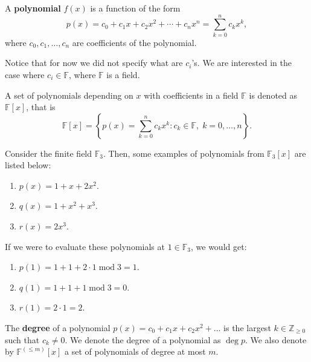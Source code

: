 \documentclass[../lecture-notes.tex]{subfiles}
\begin{document}
\begin{definition}
    A \textbf{polynomial} $f(x)$ is a function of the form
    \begin{equation}
        p(x) = c_0 + c_1 x + c_2 x^2 + \cdots + c_n x^n = \sum_{k=0}^{n} c_k x^k,
    \end{equation}
    where $c_0, c_1, \dots, c_n$ are coefficients of the polynomial.
\end{definition}

Notice that for now we did not specify what are $c_i$'s. We are interested in the case where $c_i \in \mathbb{F}$, where $\mathbb{F}$ is a field. 

\begin{definition}
    A set of polynomials depending on $x$ with coefficients in a field $\mathbb{F}$ is denoted as $\mathbb{F}[x]$, that is
    \begin{equation}
        \mathbb{F}[x] = \left\{p(x) = \sum_{k=0}^{n} c_k x^k: c_k \in \mathbb{F}, \; k = 0,\dots,n\right\}.
    \end{equation}
\end{definition}

\begin{example}
    Consider the finite field $\mathbb{F}_3$. Then, some examples of polynomials from $\mathbb{F}_3[x]$ are listed below:
    \begin{enumerate}
        \item $p(x) = 1 + x + 2x^2$.
        \item $q(x) = 1 + x^2 + x^3$.
        \item $r(x) = 2x^3$.
    \end{enumerate}

   If we were to evaluate these polynomials at $1 \in \mathbb{F}_3$, we would get:
    \begin{enumerate}
        \item $p(1) = 1 + 1 + 2 \cdot 1 \; \text{mod} \; 3 = 1$.
        \item $q(1) = 1 + 1 + 1 \; \text{mod} \; 3 = 0$.
        \item $r(1) = 2 \cdot 1 = 2$.
    \end{enumerate}
\end{example}

\begin{definition}
    The \textbf{degree} of a polynomial $p(x) = c_0+c_1x+c_2x^2+\dots$ is the largest $k \in \mathbb{Z}_{\geq 0}$ such that $c_k \neq 0$. We denote the degree of a polynomial as $\deg p$. We also denote by $\mathbb{F}^{(\leq m)}[x]$ a set of polynomials of degree at most $m$.
\end{definition}
\end{document}
